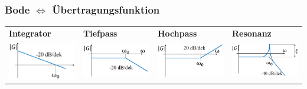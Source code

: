 \subsubsection{Bode $\Leftrightarrow$ Übertragungsfunktion}
\begin{tabularx}{\linewidth}{p{0.25\linewidth} p{0.25\linewidth} p{0.25\linewidth} p{0.25\linewidth} }
	\textbf{Integrator} 	&\textbf{Tiefpass}			&\textbf{Hochpass}				&\textbf{Resonanz}	\\
	\includegraphics[width=.75\linewidth]{bilder/sysIdentInt}&
	\includegraphics[width=.75\linewidth]{bilder/sysIdentTiefpass}&
	\includegraphics[width=.75\linewidth]{bilder/sysIdentHochpass}&
	\includegraphics[width=.75\linewidth]{bilder/sysIdentResonanz}\\

\end{tabularx}
